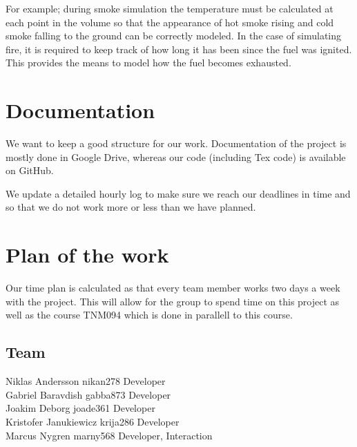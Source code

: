 \documentclass[a4paper,12pt,twoside,swedish]{report}
\begin{document}
For example; during smoke simulation the temperature must be calculated at each point in the volume so that the appearance of hot smoke rising and cold smoke falling to the ground can be correctly modeled. In the case of simulating fire, it is required to keep track of how long it has been since the fuel was ignited. This provides the means to model how the fuel becomes exhausted.

\section{Documentation}
We want to keep a good structure for our work. Documentation of the project is mostly done in Google Drive, whereas our code (including Tex code) is available on GitHub.

We update a detailed hourly log to make sure we reach our deadlines in time and so that we do not work more or less than we have planned.

\section{Plan of the work}
Our time plan is calculated as that every team member works two days a week with the project. This will allow for the group to spend time on this project as well as the course TNM094 which is done in parallell to this course.

 \subsection{Team}
Niklas Andersson	nikan278	Developer\\
Gabriel Baravdish	gabba873	Developer\\
Joakim Deborg	joade361	Developer\\
Kristofer Janukiewicz	krija286	Developer\\
Marcus Nygren	marny568	Developer, Interaction
\end{document}
